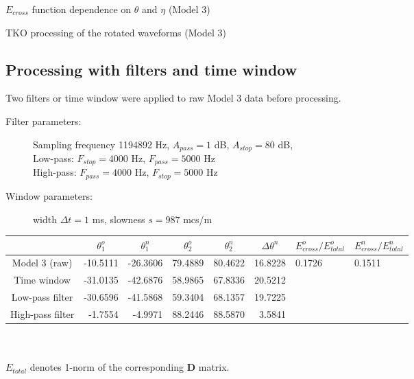 \documentclass[a4paper,11pt]{article}
\begin{document}
\begin{minipage}[h]{0.47\linewidth}	
\begin{center} 
$E_{cross}$ function dependence on $\theta$ and $\eta$ (Model 3)\\
			\label{fig:rot4_gs_solution}
\end{center}
\end{minipage} \hfill
\begin{minipage}[h]{0.47\linewidth}
\begin{center}
TKO processing of the rotated waveforms (Model 3)
			\\
	  		\label{fig:rot4_tko_comp}
\end{center}	  		
\end{minipage}

\newpage

\subsection*{Processing with filters and time window}

Two filters or time window were applied to raw Model 3 data before processing.

\begin{description}
\item[Filter parameters:] Sampling frequency 1194892 Hz, $A_{pass} = 1$ dB, $A_{stop} = 80$ dB, \\ Low-pass: $F_{stop} = 4000$ Hz, $F_{pass} = 5000$ Hz \\ High-pass: $F_{pass} = 4000$ Hz, $F_{stop} = 5000$ Hz
\item[Window parameters:] width $\Delta t=1$ ms, slowness $s = 987$ mcs/m
\end{description}

\renewcommand{\arraystretch}{1.5}
\footnotesize
\begin{tabular}{c|rr|rr|r|ll}
				&\multicolumn{1}{c}{$\theta_1^o$} & \multicolumn{1}{c|}{$\theta_1^n$} & \multicolumn{1}{c}{$\theta_2^o$} & \multicolumn{1}{c|}{$\theta_2^n$} & \multicolumn{1}{c|}{$\Delta\theta^n$}& \multicolumn{1}{c}{$E_{cross}^o/E_{total}^o$} & \multicolumn{1}{c}{$E_{cross}^n/E_{total}^n$} \\ \hline
\hline  Model 3 (raw) & -10.5111 & -26.3606 & 79.4889 & 80.4622 & 16.8228 & 0.1726 & 0.1511 \\
		Time window & -31.0135 & -42.6876 & 58.9865 & 67.8336 & 20.5212& \color{red}{0.0445} & \color{red}{0.0099} \\
	   Low-pass filter & -30.6596 & -41.5868 & 59.3404 & 68.1357 & 19.7225 & \color{red}{0.0358} & \color{red}{0.0027} \\
 	   High-pass filter & -1.7554 & -4.9971 & 88.2446 & 88.5870 & 3.5841& \color{red}{0.0602} & \color{red}{0.0597} \\ 	   
 	    \hline 
\end{tabular} 
\normalsize
\\ \\
\quad *$E_{total}$ denotes 1-norm of the corresponding $\mathbf{D}$ matrix.
\renewcommand{\arraystretch}{1.0}
\end{document}
